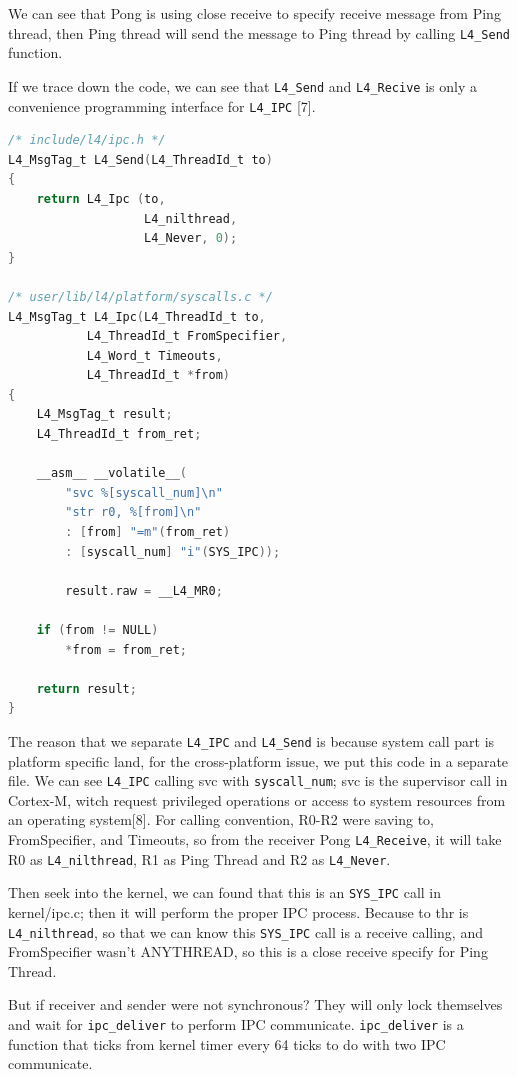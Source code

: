 \documentclass[10pt,preprint,nocopyrightspace]{sigplanconf}
\begin{document}
We can see that Pong is using close receive to specify receive message from Ping thread, then Ping thread will send the message to Ping thread by calling \texttt{L4\_Send} function.

If we trace down the code, we can see that \texttt{L4\_Send} and \texttt{L4\_Recive} is only a convenience programming interface for \texttt{L4\_IPC} [7].

\begin{lstlisting}[language=c,basicstyle=\small,frame=single]
/* include/l4/ipc.h */
L4_MsgTag_t L4_Send(L4_ThreadId_t to)
{
    return L4_Ipc (to,
                   L4_nilthread,
                   L4_Never, 0);
}

/* user/lib/l4/platform/syscalls.c */
L4_MsgTag_t L4_Ipc(L4_ThreadId_t to,
           L4_ThreadId_t FromSpecifier,
           L4_Word_t Timeouts,
           L4_ThreadId_t *from)
{
    L4_MsgTag_t result;
    L4_ThreadId_t from_ret;

    __asm__ __volatile__(
        "svc %[syscall_num]\n"
        "str r0, %[from]\n"
        : [from] "=m"(from_ret)
        : [syscall_num] "i"(SYS_IPC));

        result.raw = __L4_MR0;

    if (from != NULL)
        *from = from_ret;

    return result;
}
\end{lstlisting}

The reason that we separate \texttt{L4\_IPC} and \texttt{L4\_Send} is because system call part is platform specific land, for the cross-platform issue, we put this code in a separate file. We can see \texttt{L4\_IPC} calling svc with \texttt{syscall\_num}; svc is the supervisor call in Cortex-M, witch request privileged operations or access to system resources from an operating system[8]. For calling convention, R0-R2 were saving to, FromSpecifier, and Timeouts, so from the receiver Pong \texttt{L4\_Receive}, it will take R0 as \texttt{L4\_nilthread}, R1 as Ping Thread and R2 as \texttt{L4\_Never}.
		
Then seek into the kernel, we can found that this is an \texttt{SYS\_IPC} call in kernel/ipc.c; then it will perform the proper IPC process. Because to thr is \texttt{L4\_nilthread}, so that we can know this \texttt{SYS\_IPC} call is a receive calling, and FromSpecifier wasn't ANYTHREAD, so this is a close receive specify for Ping Thread.
	
But if receiver and sender were not synchronous? They will only lock themselves and wait for \texttt{ipc\_deliver} to perform IPC communicate. \texttt{ipc\_deliver} is a function that ticks from kernel timer every 64 ticks to do with two IPC communicate.
\end{document}
